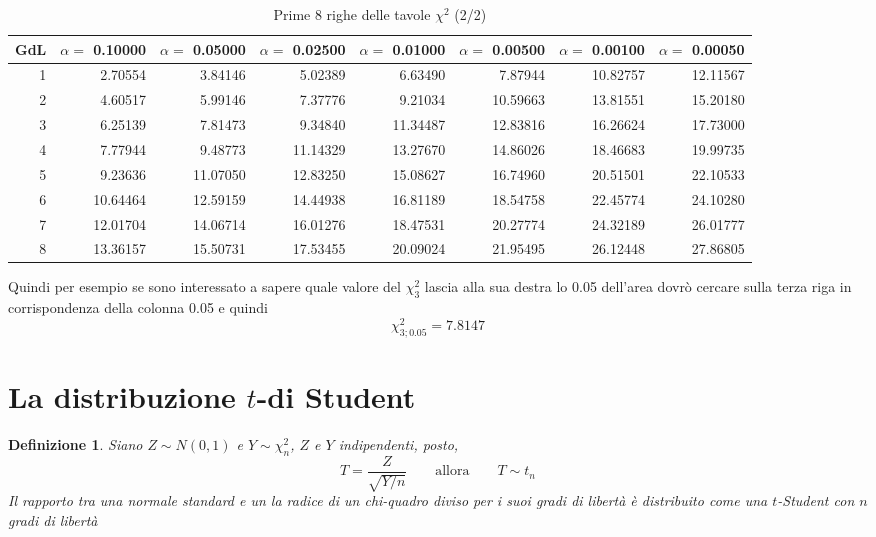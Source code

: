 \documentclass[
  11pt,
]{book}
\theoremstyle{mytheoremstyle}
\theoremstyle{mydefstyle}
\newtheorem{definition}{Definizione}[section]
\begin{document}
\begin{table}
\centering
\caption{\label{tab:chi2}Prime 8 righe delle tavole $\chi^2$ (2/2)}
\centering
\fontsize{7}{9}\selectfont
\begin{tabular}[t]{rrrrrrrr}
\toprule
GdL & $\alpha=$ 0.10000 & $\alpha=$ 0.05000 & $\alpha=$ 0.02500 & $\alpha=$ 0.01000 & $\alpha=$ 0.00500 & $\alpha=$ 0.00100 & $\alpha=$ 0.00050\\
\midrule
1 & 2.70554 & 3.84146 & 5.02389 & 6.63490 & 7.87944 & 10.82757 & 12.11567\\
2 & 4.60517 & 5.99146 & 7.37776 & 9.21034 & 10.59663 & 13.81551 & 15.20180\\
3 & 6.25139 & 7.81473 & 9.34840 & 11.34487 & 12.83816 & 16.26624 & 17.73000\\
4 & 7.77944 & 9.48773 & 11.14329 & 13.27670 & 14.86026 & 18.46683 & 19.99735\\
5 & 9.23636 & 11.07050 & 12.83250 & 15.08627 & 16.74960 & 20.51501 & 22.10533\\
6 & 10.64464 & 12.59159 & 14.44938 & 16.81189 & 18.54758 & 22.45774 & 24.10280\\
7 & 12.01704 & 14.06714 & 16.01276 & 18.47531 & 20.27774 & 24.32189 & 26.01777\\
8 & 13.36157 & 15.50731 & 17.53455 & 20.09024 & 21.95495 & 26.12448 & 27.86805\\
\bottomrule
\end{tabular}
\end{table}

Quindi per esempio se sono interessato a sapere quale valore del \(\chi_3^2\) lascia alla sua destra
lo 0.05 dell'area dovrò cercare sulla terza riga in corrispondenza della colonna 0.05
e quindi
\[
\chi_{3;0.05}^2=7.8147
\]

\section{\texorpdfstring{La distribuzione \(t\)-di Student}{La distribuzione t-di Student}}\label{la-distribuzione-t-di-student}

\begin{info}

\begin{definition}
Siano \(Z\sim N(0,1)\) e \(Y\sim\chi^2_n\), \(Z\) e \(Y\) indipendenti, posto,
\[T=\frac Z{\sqrt{Y/n}} \qquad \text{allora} \qquad T\sim t_n\]
Il rapporto tra una normale standard e un la radice di un chi-quadro diviso per i suoi gradi di libertà è distribuito come una \(t\)-Student con \(n\) \emph{gradi di libertà}
\end{definition}

\end{info}
\end{document}
